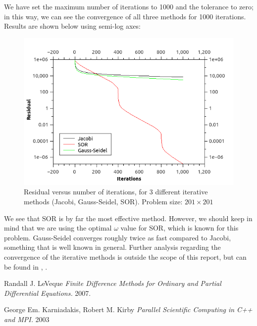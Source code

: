 \documentclass[11pt]{report}
\begin{document}
We have set the maximum number of iterations to 1000 and the tolerance to zero; in this way, we can see the convergence of all three methods for 1000 iterations. Results are shown below using semi-log axes:
\newline

\begin{figure}[h!]
\centering
\includegraphics[width=0.75\linewidth]{images/residual}
\caption{Residual versus number of iterations, for 3 different iterative methods (Jacobi, Gauss-Seidel, SOR). Problem size: $201 \times 201$}
\label{fig:residual}
\end{figure}

We see that SOR is by far the most effective method. However, we should keep in mind that we are using the optimal $\omega$ value for SOR, which is known for this problem. Gauss-Seidel converges roughly twice as fast compared to Jacobi, something that is well known in general. Further analysis regarding the convergence of the iterative methods is outside the scope of this report, but can be found in \cite{leveque}, \cite{karniadakis}.


\begin{thebibliography}{1}

   Randall J. LeVeque {\em Finite Difference Methods for Ordinary and Partial Differential Equations.}  2007.

   George Em. Karniadakis, Robert M. Kirby {\em Parallel Scientific Computing in C++ and MPI.} 2003 

  \end{thebibliography}
\end{document}
